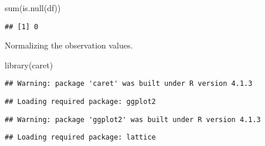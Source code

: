 \documentclass[
]{article}
\newenvironment{Shaded}{\begin{snugshade}}{\end{snugshade}}
\newcommand{\AttributeTok}[1]{\textcolor[rgb]{0.77,0.63,0.00}{#1}}
\newcommand{\FunctionTok}[1]{\textcolor[rgb]{0.00,0.00,0.00}{#1}}
\newcommand{\NormalTok}[1]{#1}
\newcommand{\OtherTok}[1]{\textcolor[rgb]{0.56,0.35,0.01}{#1}}
\newcommand{\SpecialCharTok}[1]{\textcolor[rgb]{0.00,0.00,0.00}{#1}}
\newcommand{\StringTok}[1]{\textcolor[rgb]{0.31,0.60,0.02}{#1}}
\begin{document}
\begin{Shaded}
\begin{Highlighting}[]
\FunctionTok{sum}\NormalTok{(}\FunctionTok{is.null}\NormalTok{(df))}
\end{Highlighting}
\end{Shaded}

\begin{verbatim}
## [1] 0
\end{verbatim}

Normalizing the observation values.

\begin{Shaded}
\begin{Highlighting}[]
\FunctionTok{library}\NormalTok{(caret)}
\end{Highlighting}
\end{Shaded}

\begin{verbatim}
## Warning: package 'caret' was built under R version 4.1.3
\end{verbatim}

\begin{verbatim}
## Loading required package: ggplot2
\end{verbatim}

\begin{verbatim}
## Warning: package 'ggplot2' was built under R version 4.1.3
\end{verbatim}

\begin{verbatim}
## Loading required package: lattice
\end{verbatim}

\begin{Shaded}
\end{Shaded}
\end{document}
